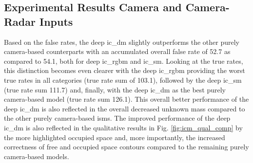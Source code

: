 \subsection{Experimental Results Camera and Camera-Radar Inputs}
\label{subsec:exp_cam_fusion_in_deep_isms}
Based on the false rates, the deep \gls{ic_dm} slightly outperforms the other purely camera-based counterparts with an accumulated overall false rate of 52.7 as compared to 54.1, both for deep \gls{ic_rgbm} and \gls{ic_sm}. Looking at the true rates, this distinction becomes even clearer with the deep \gls{ic_rgbm} providing the worst true rates in all categories (true rate sum of 103.1), followed by the deep \gls{ic_sm} (true rate sum 111.7) and, finally, with the deep \gls{ic_dm} as the best purely camera-based model (true rate sum 126.1). This overall better performance of the deep \gls{ic_dm} is also reflected in the overall decreased unknown mass compared to the other purely camera-based \gls{ism}s. The improved performance of the deep \gls{ic_dm} is also reflected in the qualitative results in Fig. \ref{fig:icm_qual_comp} by the more highlighted occupied space and, more importantly, the increased correctness of free and occupied space contours compared to the remaining purely camera-based models.
